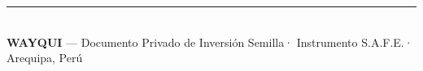 \documentclass[11pt,a4paper]{article}
\newcommand{\goldrule}{%
  {\color{WGold}\rule{\textwidth}{0.8pt}}%
}
\begin{document}
\vspace{1.2cm}

\begin{center}
  \goldrule\\[0.3cm]
  {\scriptsize\color{WSlate}
    \textbf{WAYQUI} — Documento Privado de Inversión Semilla\quad·\quad
    Instrumento S.A.F.E.\quad·\quad
    Arequipa, Perú
  }
\end{center}
\end{document}
